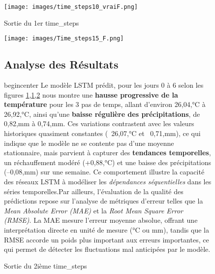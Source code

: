 \documentclass[a4paper,12pt,openany]{report}
\begin{document}
	\begin{figure}[H]
	\begin{center}
		 \begin{minipage}{\textwidth}
		    \begin{center}
		    \texttt{[image: images/time\_steps10\_vraiF.png]}
		    \end{center}
		    \end{minipage}
		
		
		\caption{Sortie du 1er time\_steps \label{Fig 3.2}}
	\end{center}
\end{figure}%
\begin{figure}[H]
	\begin{center}
		 \begin{minipage}{\textwidth}
		    \begin{center}
		    \texttt{[image: images/Time\_steps15\_F.png]}
		    \end{center}
		    \end{minipage}
	\caption{Sortie du 2ième time\_steps \label{Fig 3.3}}
	
	
		\subsection{Analyse des Résultats  }
		
		
		\quad
		
	begin{center} Le modèle LSTM prédit, pour les jours 0 à 6 selon les figures \ref{Fig 3.2},\ref{Fig 3.2},\ref{Fig 3.3} nous montre une \textbf{hausse progressive de la température} pour les 3 pas de temps, allant d’environ 26{,}04,°C à 26{,}92,°C, ainsi qu’une \textbf{baisse régulière des précipitations}, de 0{,}82,mm à 0{,}74,mm. Ces variations contrastent avec les valeurs historiques quasiment constantes (~26{,}07,°C et ~0{,}71,mm), ce qui indique que le modèle ne se contente pas d’une moyenne stationnaire, mais parvient à capturer des \textbf{tendances temporelles}, un réchauffement modéré (+0{,}88,°C) et une baisse des précipitations (–0{,}08,mm) sur une semaine. Ce comportement illustre la capacité des réseaux LSTM à modéliser les \emph{dépendances séquentielles} dans les séries temporelles.Par ailleurs, l’évaluation de la qualité des prédictions repose sur l’analyse de métriques d’erreur telles que la \emph{Mean Absolute Error (MAE)} et la \emph{Root Mean Square Error (RMSE)}. La MAE mesure l’erreur moyenne absolue, offrant une interprétation directe en unité de mesure (°C ou mm), tandis que la RMSE accorde un poids plus important aux erreurs importantes, ce qui permet de détecter les fluctuations mal anticipées par le modèle.
	\end{center}
	

\end{figure}%
\end{document}
